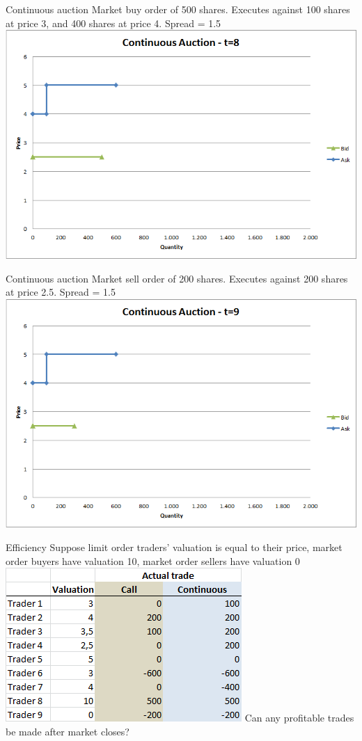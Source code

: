 \documentclass[english,10pt]{beamer}
\theoremstyle{definition}
\begin{document}
\begin{frame}{Continuous auction}
	Market buy order of 500 shares. Executes against 100 shares at price 3, and 400 shares at price 4. Spread = 1.5
	\center
	\includegraphics[width=.75\linewidth]{pics/Continuous_t8}
\end{frame}


\begin{frame}{Continuous auction}
	Market sell order of 200 shares. Executes against 200 shares at price 2.5. Spread = 1.5
	\center
	\includegraphics[width=.75\linewidth]{pics/Continuous_t9}
\end{frame}


\begin{frame}{Efficiency}
	Suppose limit order traders' valuation is equal to their price, market order buyers have valuation 10, market order sellers have valuation 0
	\quad
	\center
	\includegraphics[width=.5\linewidth]{pics/Efficiency}
	\quad
	Can any profitable trades be made after market closes?
\end{frame}
\end{document}
